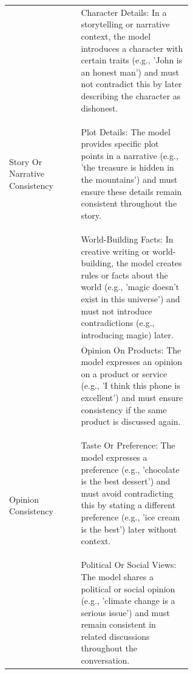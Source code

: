 \begin{longtable}{>{\raggedright\arraybackslash}p{0.2\linewidth}
                  >{\raggedright\arraybackslash}p{0.4\linewidth}}
{    Legal Or Ethical Conflicts: The model advises following the law or ethical guidelines (e.g., 'never drink and drive') and must ensure that no later suggestions contradict this advice.
} \\
\midrule
Story Or Narrative Consistency & \parbox[t]{\linewidth}{
    Character Details: In a storytelling or narrative context, the model introduces a character with certain traits (e.g., 'John is an honest man') and must not contradict this by later describing the character as dishonest.\newline\newline
    Plot Details: The model provides specific plot points in a narrative (e.g., 'the treasure is hidden in the mountains') and must ensure these details remain consistent throughout the story.\newline\newline
    World-Building Facts: In creative writing or world-building, the model creates rules or facts about the world (e.g., 'magic doesn't exist in this universe') and must not introduce contradictions (e.g., introducing magic) later.
} \\
\midrule
Opinion Consistency & \parbox[t]{\linewidth}{
    Opinion On Products: The model expresses an opinion on a product or service (e.g., 'I think this phone is excellent') and must ensure consistency if the same product is discussed again.\newline\newline
    Taste Or Preference: The model expresses a preference (e.g., 'chocolate is the best dessert') and must avoid contradicting this by stating a different preference (e.g., 'ice cream is the best') later without context.\newline\newline
    Political Or Social Views: The model shares a political or social opinion (e.g., 'climate change is a serious issue') and must remain consistent in related discussions throughout the conversation.
} \\

\end{longtable}